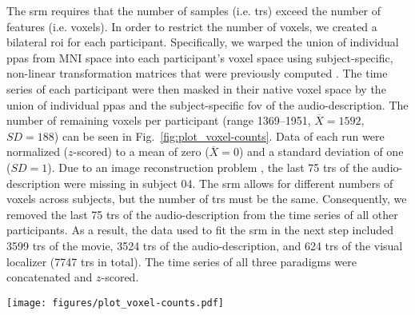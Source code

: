 
The \ac{srm} requires that the number of samples (i.e. \acp{tr}) exceed the
number of features (i.e. voxels).
%
In order to restrict the number of voxels, we created a bilateral \ac{roi} for
each participant.
%
Specifically, we warped the union of individual \acp{ppa} \citep[s. Fig. 1
in][]{haeusler2022processing} from MNI space into each participant's voxel space
using subject-specific, non-linear transformation matrices that were previously
computed
\citep[][\href{https://github.com/psychoinformatics-de/studyforrest-data-templatetransforms
}{\url{github.com/psychoinformatics-de/studyforrest-data-templatetransforms}}]{hanke2014audiomovie}.
The time series of each participant were then masked in their native voxel
space by the union of individual \acp{ppa} and the subject-specific \ac{fov} of
the audio-description.
The number of remaining voxels per participant (range 1369--1951,
$\overline{X}=1592$, $SD=188$) can be seen in Fig.~\ref{fig:plot_voxel-counts}.
Data of each run were normalized ($z$-scored) to a mean of zero
($\overline{X}=0$) and a standard deviation of one ($SD=1$).
%
Due to an image reconstruction problem \citep[cf.][]{hanke2014audiomovie}, the
last 75 \acp{tr} of the audio-description were missing in subject 04.
%
The \ac{srm} allows for different numbers of voxels across subjects, but the
number of \acp{tr} must be the same.
%
Consequently, we removed the last 75 \acp{tr} of the audio-description from the
time series of all other participants.
As a result, the data used to fit the \ac{srm} in the next step included 3599
\acp{tr} of the movie, 3524 \acp{tr} of the audio-description, and 624 \acp{tr}
of the visual localizer (7747 \acp{tr} in total).
The time series of all three paradigms were concatenated and $z$-scored.

\begin{figure*}[tbp]
\centering
\texttt{[image: figures/plot\_voxel-counts.pdf]}
\caption{
%
    \textbf{Size of the bilateral region of interest (ROI) of each participant.}
%
In order to reduce the number of voxels, we warped the union of
individual \acp{ppa} \citep[cf. Fig. 1 in][]{haeusler2022processing} from
MNI152 space into each participant's native voxel space.
%
The remaining voxels of each participant were further constrained to those
voxels that are included in the respective participant's \ac{fov} of the
audio-description \citep[cf.][]{hanke2014audiomovie}.
}
\label{fig:plot_voxel-counts}
\end{figure*}


